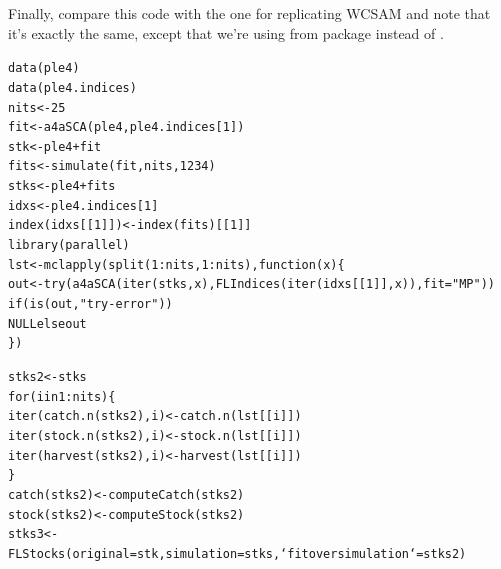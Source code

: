 \documentclass[a4paper,english,10pt]{article}\usepackage[]{graphicx}\usepackage[]{color}
\makeatletter
\newcommand{\hlnum}[1]{\textcolor[rgb]{0.063,0.58,0.627}{#1}}%
\newcommand{\hlstr}[1]{\textcolor[rgb]{0.063,0.58,0.627}{#1}}%
\newcommand{\hlopt}[1]{\textcolor[rgb]{0.196,0.196,0.196}{#1}}%
\newcommand{\hlstd}[1]{\textcolor[rgb]{0.196,0.196,0.196}{#1}}%
\newcommand{\hlkwa}[1]{\textcolor[rgb]{0.231,0.416,0.784}{#1}}%
\newcommand{\hlkwb}[1]{\textcolor[rgb]{0.627,0,0.314}{#1}}%
\newcommand{\hlkwc}[1]{\textcolor[rgb]{0,0.631,0.314}{#1}}%
\newcommand{\hlkwd}[1]{\textcolor[rgb]{0.78,0.227,0.412}{#1}}%
\newenvironment{kframe}{%
 \def\at@end@of@kframe{}%
 \ifinner\ifhmode%
  \def\at@end@of@kframe{\end{minipage}}%
  \begin{minipage}{\columnwidth}%
 \fi\fi%
 \def\FrameCommand##1{\hskip\@totalleftmargin \hskip-\fboxsep
 \colorbox{shadecolor}{##1}\hskip-\fboxsep
     \hskip-\linewidth \hskip-\@totalleftmargin \hskip\columnwidth}%
 \MakeFramed {\advance\hsize-\width
   \@totalleftmargin\z@ \linewidth\hsize
   \@setminipage}}%
 {\par\unskip\endMakeFramed%
 \at@end@of@kframe}
\newenvironment{knitrout}{}{} %
\makeatother
\begin{document}
Finally, compare this code with the one for replicating WCSAM and note that it's exactly the same, except that we're using  from package  instead of .

\begin{knitrout}
\color{fgcolor}\begin{kframe}
\begin{alltt}
\hlkwd{data}\hlstd{(ple4)}
\hlkwd{data}\hlstd{(ple4.indices)}
\hlstd{nits} \hlkwb{<-} \hlnum{25}
\hlstd{fit} \hlkwb{<-} \hlkwd{a4aSCA}\hlstd{(ple4, ple4.indices[}\hlnum{1}\hlstd{])}
\hlstd{stk} \hlkwb{<-} \hlstd{ple4} \hlopt{+} \hlstd{fit}
\hlstd{fits} \hlkwb{<-} \hlkwd{simulate}\hlstd{(fit, nits,} \hlnum{1234}\hlstd{)}
\hlstd{stks} \hlkwb{<-} \hlstd{ple4} \hlopt{+} \hlstd{fits}
\hlstd{idxs} \hlkwb{<-} \hlstd{ple4.indices[}\hlnum{1}\hlstd{]}
\hlkwd{index}\hlstd{(idxs[[}\hlnum{1}\hlstd{]])} \hlkwb{<-} \hlkwd{index}\hlstd{(fits)[[}\hlnum{1}\hlstd{]]}
\hlkwd{library}\hlstd{(parallel)}
\hlstd{lst} \hlkwb{<-} \hlkwd{mclapply}\hlstd{(}\hlkwd{split}\hlstd{(}\hlnum{1}\hlopt{:}\hlstd{nits,} \hlnum{1}\hlopt{:}\hlstd{nits),} \hlkwa{function}\hlstd{(}\hlkwc{x}\hlstd{) \{}
    \hlstd{out} \hlkwb{<-} \hlkwd{try}\hlstd{(}\hlkwd{a4aSCA}\hlstd{(}\hlkwd{iter}\hlstd{(stks, x),} \hlkwd{FLIndices}\hlstd{(}\hlkwd{iter}\hlstd{(idxs[[}\hlnum{1}\hlstd{]], x)),} \hlkwc{fit} \hlstd{=} \hlstr{"MP"}\hlstd{))}
    \hlkwa{if} \hlstd{(}\hlkwd{is}\hlstd{(out,} \hlstr{"try-error"}\hlstd{))}
        \hlkwa{NULL else} \hlstd{out}
\hlstd{\})}

\hlstd{stks2} \hlkwb{<-} \hlstd{stks}
\hlkwa{for} \hlstd{(i} \hlkwa{in} \hlnum{1}\hlopt{:}\hlstd{nits) \{}
    \hlkwd{iter}\hlstd{(}\hlkwd{catch.n}\hlstd{(stks2), i)} \hlkwb{<-} \hlkwd{catch.n}\hlstd{(lst[[i]])}
    \hlkwd{iter}\hlstd{(}\hlkwd{stock.n}\hlstd{(stks2), i)} \hlkwb{<-} \hlkwd{stock.n}\hlstd{(lst[[i]])}
    \hlkwd{iter}\hlstd{(}\hlkwd{harvest}\hlstd{(stks2), i)} \hlkwb{<-} \hlkwd{harvest}\hlstd{(lst[[i]])}
\hlstd{\}}
\hlkwd{catch}\hlstd{(stks2)} \hlkwb{<-} \hlkwd{computeCatch}\hlstd{(stks2)}
\hlkwd{stock}\hlstd{(stks2)} \hlkwb{<-} \hlkwd{computeStock}\hlstd{(stks2)}
\hlstd{stks3} \hlkwb{<-} \hlkwd{FLStocks}\hlstd{(}\hlkwc{original} \hlstd{= stk,} \hlkwc{simulation} \hlstd{= stks,} \hlkwc{`fit over simulation`} \hlstd{= stks2)}
\end{alltt}
\end{kframe}
\end{knitrout}
\end{document}
